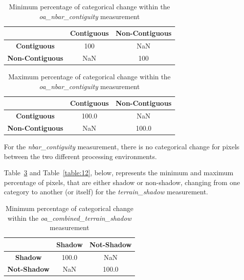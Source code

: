 \documentclass[a4paper]{article}
\begin{document}
    \begin{table}[ht!]
      \caption{Minimum percentage of categorical change within the \textit{oa\_nbar\_contiguity} measurement}\label{table:9}
      \centering
      \begin{tabular}{ccc} \midrule
        & \textbf{Contiguous} & \textbf{Non-Contiguous} \\ \midrule
        \textbf{Contiguous} & 100 & NaN \\
        \textbf{Non-Contiguous} & NaN & 100 \\
      \end{tabular}
    \end{table}

    \begin{table}[ht!]
      \caption{Maximum percentage of categorical change within the \textit{oa\_nbar\_contiguity} measurement}\label{table:10}
      \centering
      \begin{tabular}{ccc} \midrule
        & \textbf{Contiguous} & \textbf{Non-Contiguous} \\ \midrule
        \textbf{Contiguous} & 100.0 & NaN \\
        \textbf{Non-Contiguous} & NaN & 100.0 \\
      \end{tabular}
    \end{table}

    \begin{flushleft}
      For the \textit{nbar\_contiguity} measurement, there is no categorical change for pixels between the two different processing environments.
    \end{flushleft}

  \clearpage

    \begin{flushleft}
      Table~\ref{table:11} and Table~\ref{table:12}, below, represents the minimum and maximum percentage of pixels, that are either shadow or non-shadow, changing from one category to another (or itself) for the \textit{terrain\_shadow} measurement.
    \end{flushleft}

    \begin{table}[ht!]
      \caption{Minimum percentage of categorical change within the \textit{oa\_combined\_terrain\_shadow} measurement}\label{table:11}
      \centering
      \begin{tabular}{ccc} \midrule
        & \textbf{Shadow} & \textbf{Not-Shadow} \\ \midrule
        \textbf{Shadow} & 100.0 & NaN \\
        \textbf{Not-Shadow} & NaN & 100.0 \\
      \end{tabular}
    \end{table}
\end{document}
